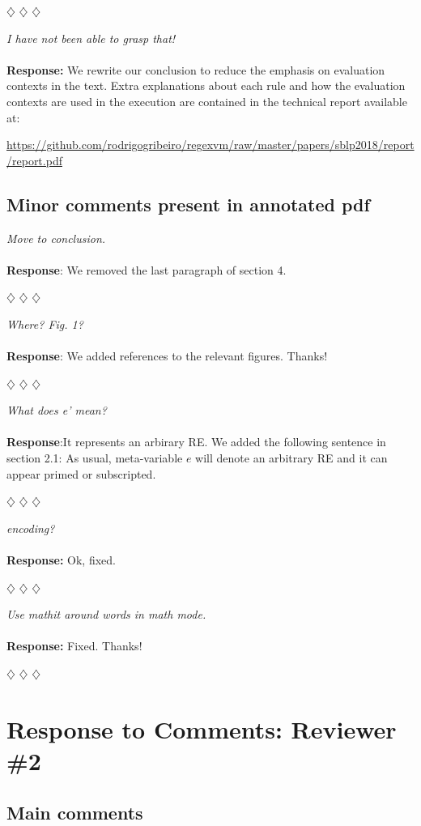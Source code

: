 \documentclass{article}
\newcommand{\separador}{\begin{center}
$\diamondsuit$ $\diamondsuit$ $\diamondsuit$
\end{center}}
\newcommand{\report}{\begin{center}\url{https://github.com/rodrigogribeiro/regexvm/raw/master/papers/sblp2018/report/report.pdf}\end{center}}
\begin{document}
\separador

\noindent\textit{I have not been able to grasp that!}
\\
\\
\noindent\textbf{Response:} We rewrite our conclusion to reduce the emphasis on evaluation contexts in the text. Extra explanations about each rule
and how the evaluation contexts are used in the execution are contained in the technical report available at:

\report


\subsection*{Minor comments present in annotated pdf}

\noindent\textit{Move to conclusion.}
\\
\\
\noindent\textbf{Response}: We removed the last paragraph of section 4.

\separador

\noindent\textit{Where? Fig. 1?}
\\
\\
\noindent\textbf{Response}: We added references to the relevant figures. Thanks!

\separador

\noindent\textit{What does e’ mean?}
\\
\\
\noindent\textbf{Response}:It represents an arbirary RE. We added the following sentence in section 2.1:
As usual, meta-variable $e$ will denote an arbitrary RE and it can appear primed or subscripted.

\separador

\noindent\textit{encoding?}
\\
\\
\noindent\textbf{Response:} Ok, fixed.


\separador

\noindent\textit{Use mathit around words in math mode.}
\\
\\
\noindent\textbf{Response:} Fixed. Thanks!

\separador


\section*{Response to Comments: Reviewer \#2}

\subsection*{Main comments}
\end{document}
